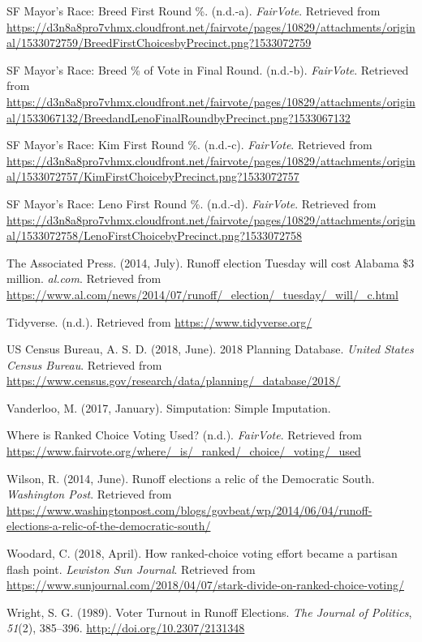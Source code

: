 \documentclass[12pt,twoside]{reedthesis}
\begin{document}
\leavevmode\hypertarget{ref-noauthor_sf_nodate-1}{}%
SF Mayor's Race: Breed First Round \%. (n.d.-a). \emph{FairVote}. Retrieved from \url{https://d3n8a8pro7vhmx.cloudfront.net/fairvote/pages/10829/attachments/original/1533072759/BreedFirstChoicesbyPrecinct.png?1533072759}

\leavevmode\hypertarget{ref-noauthor_sf_nodate}{}%
SF Mayor's Race: Breed \% of Vote in Final Round. (n.d.-b). \emph{FairVote}. Retrieved from \url{https://d3n8a8pro7vhmx.cloudfront.net/fairvote/pages/10829/attachments/original/1533067132/BreedandLenoFinalRoundbyPrecinct.png?1533067132}

\leavevmode\hypertarget{ref-noauthor_sf_nodate-3}{}%
SF Mayor's Race: Kim First Round \%. (n.d.-c). \emph{FairVote}. Retrieved from \url{https://d3n8a8pro7vhmx.cloudfront.net/fairvote/pages/10829/attachments/original/1533072757/KimFirstChoicebyPrecinct.png?1533072757}

\leavevmode\hypertarget{ref-noauthor_sf_nodate-2}{}%
SF Mayor's Race: Leno First Round \%. (n.d.-d). \emph{FairVote}. Retrieved from \url{https://d3n8a8pro7vhmx.cloudfront.net/fairvote/pages/10829/attachments/original/1533072758/LenoFirstChoicebyPrecinct.png?1533072758}

\leavevmode\hypertarget{ref-the_associated_press_runoff_2014}{}%
The Associated Press. (2014, July). Runoff election Tuesday will cost Alabama \$3 million. \emph{al.com}. Retrieved from \url{https://www.al.com/news/2014/07/runoff/_election/_tuesday/_will/_c.html}

\leavevmode\hypertarget{ref-noauthor_tidyverse_nodate}{}%
Tidyverse. (n.d.). Retrieved from \url{https://www.tidyverse.org/}

\leavevmode\hypertarget{ref-us_census_bureau_2018_2018}{}%
US Census Bureau, A. S. D. (2018, June). 2018 Planning Database. \emph{United States Census Bureau}. Retrieved from \url{https://www.census.gov/research/data/planning/_database/2018/}

\leavevmode\hypertarget{ref-vanderloo_simputation_2017}{}%
Vanderloo, M. (2017, January). Simputation: Simple Imputation.

\leavevmode\hypertarget{ref-noauthor_where_nodate}{}%
Where is Ranked Choice Voting Used? (n.d.). \emph{FairVote}. Retrieved from \url{https://www.fairvote.org/where/_is/_ranked/_choice/_voting/_used}

\leavevmode\hypertarget{ref-wilson_runoff_2014}{}%
Wilson, R. (2014, June). Runoff elections a relic of the Democratic South. \emph{Washington Post}. Retrieved from \url{https://www.washingtonpost.com/blogs/govbeat/wp/2014/06/04/runoff-elections-a-relic-of-the-democratic-south/}

\leavevmode\hypertarget{ref-woodard_how_2018}{}%
Woodard, C. (2018, April). How ranked-choice voting effort became a partisan flash point. \emph{Lewiston Sun Journal}. Retrieved from \url{https://www.sunjournal.com/2018/04/07/stark-divide-on-ranked-choice-voting/}

\leavevmode\hypertarget{ref-wright_voter_1989}{}%
Wright, S. G. (1989). Voter Turnout in Runoff Elections. \emph{The Journal of Politics}, \emph{51}(2), 385--396. \url{http://doi.org/10.2307/2131348}


\end{document}
